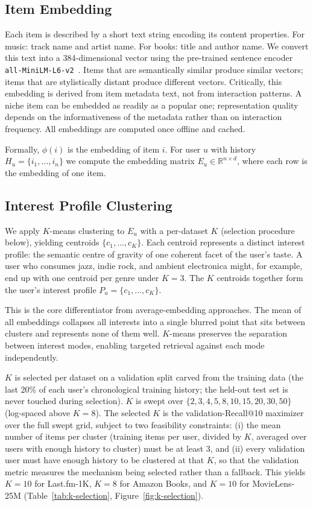 \documentclass[11pt,a4paper]{article}
\begin{document}
\subsection{Item Embedding}
Each item is described by a short text string encoding its content properties.
For music: track name and artist name. For books: title and author name. We
convert this text into a 384-dimensional vector using the pre-trained sentence
encoder \texttt{all-\allowbreak MiniLM-\allowbreak L6-\allowbreak v2}~\cite{reimers2019,wang2020}. Items that are
semantically similar produce similar vectors; items that are stylistically
distant produce different vectors. Critically, this embedding is derived from item metadata text, not from
interaction patterns. A niche item can be embedded as readily as a popular
one; representation quality depends on the informativeness of the metadata
rather than on interaction frequency. All embeddings are computed once offline
and cached.

Formally, $\phi(i)$ is the embedding of item $i$. For user $u$ with history
$H_u = \{i_1, \ldots, i_n\}$ we compute the embedding matrix
$E_u \in \mathbb{R}^{n \times d}$, where each row is the embedding of one
item.

\subsection{Interest Profile Clustering}
We apply $K$-means clustering to $E_u$ with a per-dataset $K$ (selection
procedure below), yielding centroids $\{c_1, \ldots, c_K\}$. Each centroid
represents a distinct interest profile: the semantic centre of gravity of
one coherent facet of the user's taste. A user who consumes jazz, indie
rock, and ambient electronica might, for example, end up with one centroid
per genre under $K=3$. The $K$ centroids together form the user's interest
profile $P_u = \{c_1, \ldots, c_K\}$.

This is the core differentiator from average-embedding approaches. The mean
of all embeddings collapses all interests into a single blurred point that
sits between clusters and represents none of them well. $K$-means preserves
the separation between interest modes, enabling targeted retrieval against
each mode independently.

$K$ is selected per dataset on a validation split carved from the
training data (the last 20\% of each user's chronological training
history; the held-out test set is never touched during selection). $K$
is swept over $\{2, 3, 4, 5, 8, 10, 15, 20, 30, 50\}$ (log-spaced above
$K=8$). The selected $K$ is the validation-Recall@10 maximizer over the
full swept grid, subject to two feasibility constraints: (i) the mean
number of items per cluster (training items per user, divided by $K$,
averaged over users with enough history to cluster) must be at least 3,
and (ii) every validation user must have enough history to be clustered
at that $K$, so that the validation metric measures the mechanism being
selected rather than a fallback. This yields $K=10$ for Last.fm-1K,
$K=8$ for Amazon Books, and $K=10$ for MovieLens-25M
(Table~\ref{tab:k-selection}, Figure~\ref{fig:k-selection}).
\end{document}
